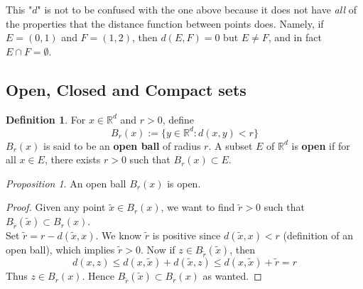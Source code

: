 \documentclass[a4paper, 11pt]{book}
\theoremstyle{definition}
\newtheorem{definition}{Definition}[section]
\theoremstyle{remark}
\newtheorem{prop}{Proposition}
\begin{document}
    This "$d$" is not to be confused with the one above because it does not have \textit{all} of the properties that the distance
    function between points does. Namely, if $E = (0,1)$ and $F = (1,2)$, then $d(E,F)=0$ but $E\neq F$, and in fact 
    $E\cap F=\emptyset$.

    \subsection{Open, Closed and Compact sets}

    \begin{definition}
        For $x\in\mathbb{R}^d$ and $r>0$, define
        \[ B_r(x) := \{y\in\mathbb{R}^d: d(x,y)<r\} \]
        $B_r(x)$ is said to be an \textbf{open ball} of radius $r$. A subset $E$ of $\mathbb{R}^d$ is \textbf{open} if for all $x\in E$,
        there exists $r>0$ such that $B_r(x)\subset E$.
    \end{definition}

    \begin{prop}
        An open ball $B_r(x)$ is open.
    \end{prop}
    \begin{proof}
        Given any point $\widetilde{x}\in B_r(x)$, we want to find $\widetilde{r}>0$ such that 
        $B_{\widetilde{r}}(\widetilde{x})\subset B_r(x)$.\\

        Set $\widetilde{r} = r - d(\widetilde{x},x)$. We know $\widetilde{r}$ is positive since $d(\widetilde{x},x)<r$ (definition
        of an open ball), which implies $\widetilde{r}>0$. Now if $z\in B_{\widetilde{r}}(\widetilde{x})$, then
        \[ d(x,z) \leq d(x,\widetilde{x}) + d(\widetilde{x},z) \leq d(x,\widetilde{x}) + \widetilde{r} = r\]
        Thus $z\in B_r(x)$. Hence $B_{\widetilde{r}}(\widetilde{x})\subset B_r(x)$ as wanted.
    \end{proof}
\end{document}
